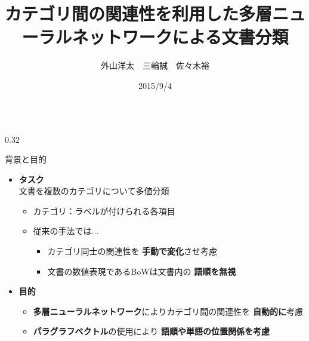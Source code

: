 \documentclass[8pt,unicode]{beamer}
\title{カテゴリ間の関連性を利用した多層ニューラルネットワークによる文書分類}
\author{外山洋太　三輪誠　佐々木裕}
\institute{豊田工業大学 工学部 先端工学基礎学科}
\date{2015/9/4}
\newcommand{\columnscale}{0.32}
\newcommand{\itemtitle}[1]{\textbf{#1} \\}
\newcommand{\good}[1]{\textbf{\color{orange} #1}}
\newcommand{\bad}[1]{\textbf{\color{blue} #1}}
\newcommand{\keyword}[1]{\textbf{\color{red} #1}}
\begin{document}
\begin{frame}{}
\vspace{-8ex}
\begin{columns}[t]

\begin{column}{\columnscale\textwidth} %
  \begin{block}{背景と目的}
    \begin{itemize}
      \item \itemtitle{タスク}
        文書を複数のカテゴリについて多値分類
        \begin{itemize}
          \item カテゴリ：ラベルが付けられる各項目
          \item 従来の手法では...
            \begin{itemize}
              \item カテゴリ同士の関連性を\bad{手動で変化}させ考慮
              \item 文書の数値表現であるBoWは文書内の\bad{語順を無視}
            \end{itemize}
        \end{itemize}
      \item \itemtitle{目的}
        \begin{itemize}
          \item \keyword{多層ニューラルネットワーク}によりカテゴリ間の関連性を
            \good{自動的に}考慮 \\
          \item \keyword{パラグラフベクトル}の使用により
            \good{語順や単語の位置関係を考慮}
        \end{itemize}
    \end{itemize}
  \end{block}


\end{column}
\end{columns}
\end{frame}
\end{document}
